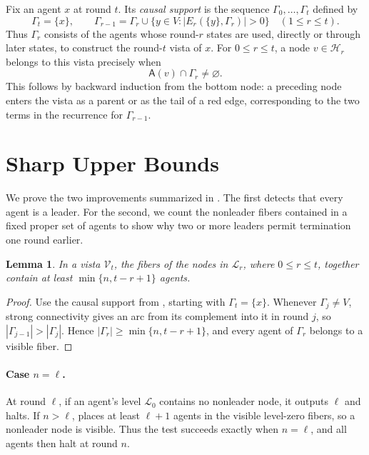 \documentclass[11pt]{article}
\newcommand{\agents}{\mathsf A}
\newtheorem{lemma}{Lemma}
\begin{document}
Fix an agent \(x\) at round \(t\).  Its \emph{causal support} is the
sequence \(\Gamma_0,\ldots,\Gamma_t\) defined by
\[
 \Gamma_t=\{x\},\qquad
 \Gamma_{r-1}=\Gamma_r\cup
 \{y\in V:|E_r(\{y\},\Gamma_r)|>0\}
 \quad(1\leq r\leq t).
\]
Thus \(\Gamma_r\) consists of the agents whose round-\(r\) states are
used, directly or through later states, to construct the round-\(t\)
vista of \(x\). For \(0\leq r\leq t\), a node
\(v\in\mathcal H_r\) belongs to this vista precisely when
\[
                  \agents(v)\cap\Gamma_r\neq\varnothing.
\]
This follows by backward induction from the bottom node: a preceding node
enters the vista as a parent or as the tail of a red edge, corresponding
to the two terms in the recurrence for \(\Gamma_{r-1}\).

\section{Sharp Upper Bounds}
\label{app:optimizations}

We prove the two improvements summarized in .
The first detects that every agent is a leader. For the second,
we count the nonleader fibers contained in a fixed proper set of
agents to show why two or more leaders permit termination one round
earlier.

\begin{lemma}
\label{lem:tail-exposure}
In a vista \(\mathcal V_t\), the fibers of the nodes in
\(\mathcal L_r\), where \(0\leq r\leq t\), together contain at
least \(\min\{n,t-r+1\}\) agents.
\end{lemma}

\begin{proof}
Use the causal support from , starting with
\(\Gamma_t=\{x\}\). Whenever \(\Gamma_j\neq V\), strong connectivity
gives an arc from its complement into it in round \(j\), so
\(|\Gamma_{j-1}|>|\Gamma_j|\). Hence
\(|\Gamma_r|\geq\min\{n,t-r+1\}\), and every agent of \(\Gamma_r\)
belongs to a visible fiber.
\end{proof}

\paragraph{Case \(n=\ell\).}
At round \(\ell\), if an agent's level \(\mathcal L_0\) contains
no nonleader node, it outputs \(\ell\) and halts. If \(n>\ell\),
 places at least \(\ell+1\) agents in the
visible level-zero fibers, so a nonleader node is visible.
Thus the test succeeds exactly when \(n=\ell\), and all agents
then halt at round \(n\).
\end{document}
